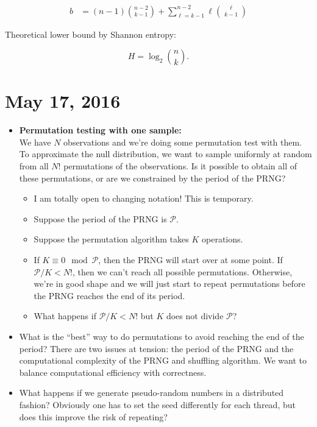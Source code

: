 \documentclass[12pt]{article}
\begin{document}
\begin{align*}
 b &= (n-1)  {{n-2} \choose {k-1}} + \sum_{\ell=k-1}^{n-2} \ell {{\ell} \choose {k-1}}
\end{align*}

Theoretical lower bound by Shannon entropy:

$$ H = \log_2 {{n} \choose {k}}.$$


\section{May 17, 2016}
\begin{itemize}
\item \textbf{Permutation testing with one sample:} \\
We have $N$ observations and we're doing some permutation test with them.
To approximate the null distribution, we want to sample uniformly at random from all $N!$ permutations of the observations.
Is it possible to obtain all of these permutations, or are we constrained by the period of the PRNG?
\begin{itemize}
\item I am totally open to changing notation! This is temporary.
\item Suppose the period of the PRNG is $\mathcal{P}$.
\item Suppose the permutation algorithm takes $K$ operations.
\item If $K \equiv 0 \mod \mathcal{P}$, then the PRNG will start over at some point. If $\mathcal{P}/K < N!$, then we can't reach all possible permutations.
Otherwise, we're in good shape and we will just start to repeat permutations before the PRNG reaches the end of its period.
\item What happens if $\mathcal{P}/K < N!$ but $K$ does not divide $\mathcal{P}$?
\end{itemize}
\item What is the ``best'' way to do permutations to avoid reaching the end of the period?
There are two issues at tension: the period of the PRNG and the computational complexity of the PRNG and shuffling algorithm.
We want to balance computational efficiency with correctness.
\item What happens if we generate pseudo-random numbers in a distributed fashion?
Obviously one has to set the seed differently for each thread, but does this improve the risk of repeating?
\end{itemize}



\end{document}
